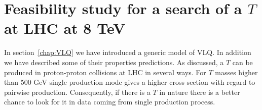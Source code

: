 %
%
%
%
%
%

\chapter{Feasibility study for a search of a $T$ at LHC at 8 TeV}
\label{chap:pheno}

In section~\ref{chap:VLQ} we have introduced a generic model of VLQ. In addition we have described some of their properties predictions. As discussed, a $T$ can be produced in proton-proton collisions at LHC in several ways. For $T$ masses higher than 500 GeV single production mode gives a higher cross section with regard to pairwise production. Consequently, if there is a $T$ in nature there is a better chance to look for it in data coming from single production process. 

